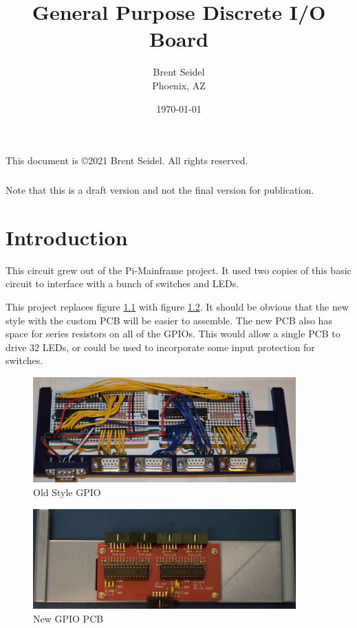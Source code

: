 \documentclass[10pt, openany]{book}
\title{General Purpose Discrete I/O Board}
\author{Brent Seidel \\ Phoenix, AZ}
\date{ \today }
\begin{document}
%
%
\frontmatter
\maketitle
\begin{center}
This document is \copyright 2021 Brent Seidel.  All rights reserved.

\paragraph{}Note that this is a draft version and not the final version for publication.
\end{center}
\tableofcontents
\listoffigures
\listoftables

\mainmatter
\chapter{Introduction}
This circuit grew out of the Pi-Mainframe project.  It used two copies of this basic circuit to interface with a bunch of switches and LEDs.

This project replaces figure \ref{fig:Old-GPIO} with figure \ref{fig:New-GPIO}.  It should be obvious that the new style with the custom PCB will be easier to assemble.  The new PCB also has space for series resistors on all of the GPIOs.  This would allow a single PCB to drive 32 LEDs, or could be used to incorporate some input protection for switches.

\begin{figure}[ht!]
  \centering
  \includegraphics[width=0.9\textwidth]{../Pictures/Old Style.jpg}
  \caption{Old Style GPIO}
  \label{fig:Old-GPIO}
\end{figure}

\begin{figure}[ht!]
  \centering
  \includegraphics[width=0.9\textwidth]{../Pictures/Mounted.jpg}
  \caption{New GPIO PCB}
  \label{fig:New-GPIO}
\end{figure}
\end{document}
